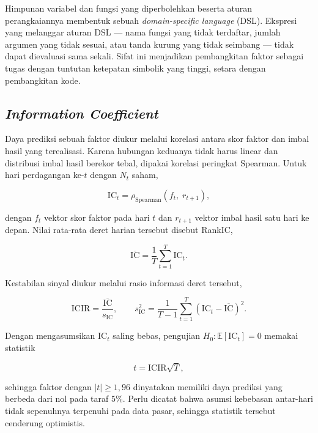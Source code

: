 Himpunan variabel dan fungsi yang diperbolehkan beserta aturan perangkaiannya
membentuk sebuah \textit{domain-specific language} (DSL). Ekspresi yang
melanggar aturan DSL --- nama fungsi yang tidak terdaftar, jumlah argumen yang
tidak sesuai, atau tanda kurung yang tidak seimbang --- tidak dapat dievaluasi
sama sekali. Sifat ini menjadikan pembangkitan faktor sebagai tugas dengan
tuntutan ketepatan simbolik yang tinggi, setara dengan pembangkitan kode.

\subsection{\textit{Information Coefficient}}

Daya prediksi sebuah faktor diukur melalui korelasi antara skor faktor dan
imbal hasil yang terealisasi. Karena hubungan keduanya tidak harus linear dan
distribusi imbal hasil berekor tebal, dipakai korelasi peringkat Spearman.
Untuk hari perdagangan ke-$t$ dengan $N_t$ saham,

\begin{equation}
    \mathrm{IC}_t = \rho_{\text{Spearman}}
    \left( f_t,\; r_{t+1} \right),
\end{equation}

dengan $f_t$ vektor skor faktor pada hari $t$ dan $r_{t+1}$ vektor imbal hasil
satu hari ke depan. Nilai rata-rata deret harian tersebut disebut RankIC,

\begin{equation}
    \overline{\mathrm{IC}} = \frac{1}{T}\sum_{t=1}^{T}\mathrm{IC}_t .
\end{equation}

Kestabilan sinyal diukur melalui rasio informasi deret tersebut,

\begin{equation}
    \mathrm{ICIR} = \frac{\overline{\mathrm{IC}}}{s_{\mathrm{IC}}},
    \qquad
    s_{\mathrm{IC}}^2 = \frac{1}{T-1}\sum_{t=1}^{T}
    \left(\mathrm{IC}_t - \overline{\mathrm{IC}}\right)^2 .
\end{equation}

Dengan mengasumsikan $\mathrm{IC}_t$ saling bebas, pengujian $H_0:
\mathbb{E}[\mathrm{IC}_t] = 0$ memakai statistik

\begin{equation}
    t = \mathrm{ICIR}\sqrt{T},
\end{equation}

sehingga faktor dengan $|t| \ge 1{,}96$ dinyatakan memiliki daya prediksi yang
berbeda dari nol pada taraf $5\%$. Perlu dicatat bahwa asumsi kebebasan
antar-hari tidak sepenuhnya terpenuhi pada data pasar, sehingga statistik
tersebut cenderung optimistis.

